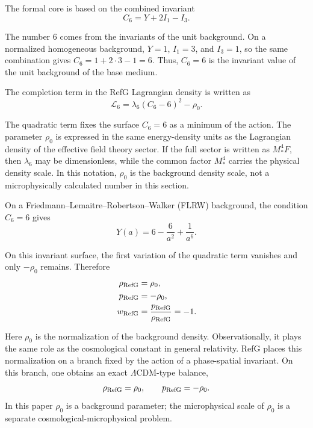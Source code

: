 \documentclass[12pt]{article}
\begin{document}
The formal core is based on the combined invariant
\begin{equation}
C_6=Y+2I_1-I_3 .
\end{equation}

The number $6$ comes from the invariants of the unit background. On a normalized homogeneous background, $Y=1$, $I_1=3$, and $I_3=1$, so the same combination gives $C_6=1+2\cdot3-1=6$. Thus, $C_6=6$ is the invariant value of the unit background of the base medium.

The completion term in the RefG Lagrangian density is written as
\begin{equation}
\mathcal L_6=\lambda_6(C_6-6)^2-\rho_0 .
\end{equation}

The quadratic term fixes the surface $C_6=6$ as a minimum of the action. The parameter $\rho_0$ is expressed in the same energy-density units as the Lagrangian density of the effective field theory sector. If the full sector is written as $M_*^4F$, then $\lambda_6$ may be dimensionless, while the common factor $M_*^4$ carries the physical density scale. In this notation, $\rho_0$ is the background density scale, not a microphysically calculated number in this section.

On a Friedmann--Lemaitre--Robertson--Walker (FLRW) background, the condition $C_6=6$ gives
\begin{equation}
Y(a)=6-\frac{6}{a^2}+\frac{1}{a^6}.
\end{equation}

On this invariant surface, the first variation of the quadratic term vanishes and only $-\rho_0$ remains. Therefore
\begin{align}
\rho_{\rm RefG} &= \rho_0, \\
p_{\rm RefG} &= -\rho_0, \\
w_{\rm RefG} &= \frac{p_{\rm RefG}}{\rho_{\rm RefG}}=-1 .
\end{align}

Here $\rho_0$ is the normalization of the background density. Observationally, it plays the same role as the cosmological constant in general relativity. RefG places this normalization on a branch fixed by the action of a phase-spatial invariant. On this branch, one obtains an exact $\Lambda$CDM-type balance,
\begin{equation}
\rho_{\rm RefG}=\rho_0,\qquad p_{\rm RefG}=-\rho_0 .
\end{equation}
In this paper $\rho_0$ is a background parameter; the microphysical scale of $\rho_0$ is a separate cosmological-microphysical problem.
\end{document}
